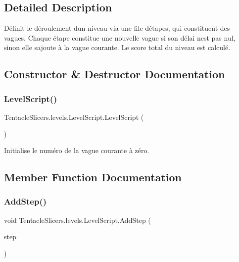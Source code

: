 \subsection{Detailed Description}
Définit le déroulement d\textquotesingle{}un niveau via une file d\textquotesingle{}étapes, qui constituent des vagues. Chaque étape constitue une nouvelle vague si son délai n\textquotesingle{}est pas nul, sinon elle s\textquotesingle{}ajoute à la vague courante. Le score total du niveau est calculé. 



\subsection{Constructor \& Destructor Documentation}
\mbox{\label{class_tentacle_slicers_1_1levels_1_1_level_script_a7618d5285222ca9e8a9bb84a9f58383d}} 
\subsubsection{\texorpdfstring{Level\+Script()}{LevelScript()}}
{\footnotesize\ttfamily Tentacle\+Slicers.\+levels.\+Level\+Script.\+Level\+Script (\begin{DoxyParamCaption}{ }\end{DoxyParamCaption})}



Initialise le numéro de la vague courante à zéro. 



\subsection{Member Function Documentation}
\mbox{\label{class_tentacle_slicers_1_1levels_1_1_level_script_ab14cf8eb6a0953e29f31bab2af9ab4ad}} 
\subsubsection{\texorpdfstring{Add\+Step()}{AddStep()}}
{\footnotesize\ttfamily void Tentacle\+Slicers.\+levels.\+Level\+Script.\+Add\+Step (\begin{DoxyParamCaption}\item[{\hyperlink{class_tentacle_slicers_1_1levels_1_1_level_step}{Level\+Step}}]{step }\end{DoxyParamCaption})}



